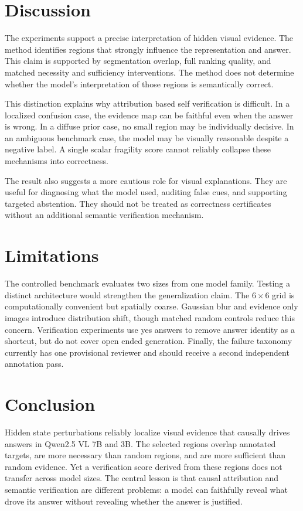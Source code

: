 \documentclass{article}
\begin{document}
\section{Discussion}

The experiments support a precise interpretation of hidden visual evidence. The method identifies regions that strongly influence the representation and answer. This claim is supported by segmentation overlap, full ranking quality, and matched necessity and sufficiency interventions. The method does not determine whether the model's interpretation of those regions is semantically correct.

This distinction explains why attribution based self verification is difficult. In a localized confusion case, the evidence map can be faithful even when the answer is wrong. In a diffuse prior case, no small region may be individually decisive. In an ambiguous benchmark case, the model may be visually reasonable despite a negative label. A single scalar fragility score cannot reliably collapse these mechanisms into correctness.

The result also suggests a more cautious role for visual explanations. They are useful for diagnosing what the model used, auditing false cues, and supporting targeted abstention. They should not be treated as correctness certificates without an additional semantic verification mechanism.

\section{Limitations}

The controlled benchmark evaluates two sizes from one model family. Testing a distinct architecture would strengthen the generalization claim. The $6\times6$ grid is computationally convenient but spatially coarse. Gaussian blur and evidence only images introduce distribution shift, though matched random controls reduce this concern. Verification experiments use yes answers to remove answer identity as a shortcut, but do not cover open ended generation. Finally, the failure taxonomy currently has one provisional reviewer and should receive a second independent annotation pass.

\section{Conclusion}

Hidden state perturbations reliably localize visual evidence that causally drives answers in Qwen2.5 VL 7B and 3B. The selected regions overlap annotated targets, are more necessary than random regions, and are more sufficient than random evidence. Yet a verification score derived from these regions does not transfer across model sizes. The central lesson is that causal attribution and semantic verification are different problems: a model can faithfully reveal what drove its answer without revealing whether the answer is justified.



\end{document}
